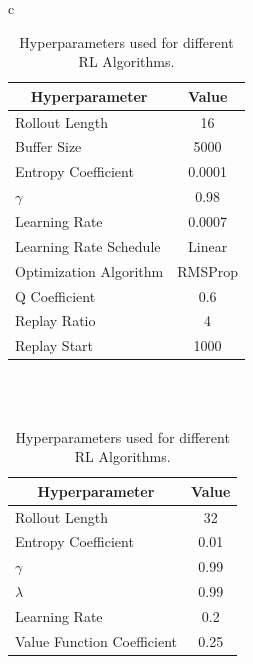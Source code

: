 \begin{table}[htp]
    \begin{center}
        \begin{tabular}{c}
            \begin{tabular}{|l|c|}
                \hline
                \multicolumn{1}{|c|}{Hyperparameter} & Value \\
                \hline
                Rollout Length & 16 \\
                Buffer Size & 5000 \\
                Entropy Coefficient & 0.0001 \\
                $\gamma$ & 0.98 \\
                Learning Rate & 0.0007 \\
                Learning Rate Schedule & Linear \\
                Optimization Algorithm & RMSProp \cite{tieleman2012lecture} \\
                Q Coefficient & 0.6 \\
                Replay Ratio & 4 \\
                Replay Start & 1000 \\
                \hline
            \end{tabular} \\
             \\
            \addlinespace[0.5cm]
            \begin{tabular}{|l|c|}
                \hline
                \multicolumn{1}{|c|}{Hyperparameter} & Value \\
                \hline
                Rollout Length & 32 \\
                Entropy Coefficient & 0.01 \\
                $\gamma$ & 0.99 \\
                $\lambda$ & 0.99 \\
                Learning Rate & 0.2 \\
                Value Function Coefficient & 0.25 \\
                \hline
            \end{tabular} \\
             \\
    
        \end{tabular}
    \end{center}
    \caption[Hyperparameters]{Hyperparameters used for different RL Algorithms.}
\end{table}


